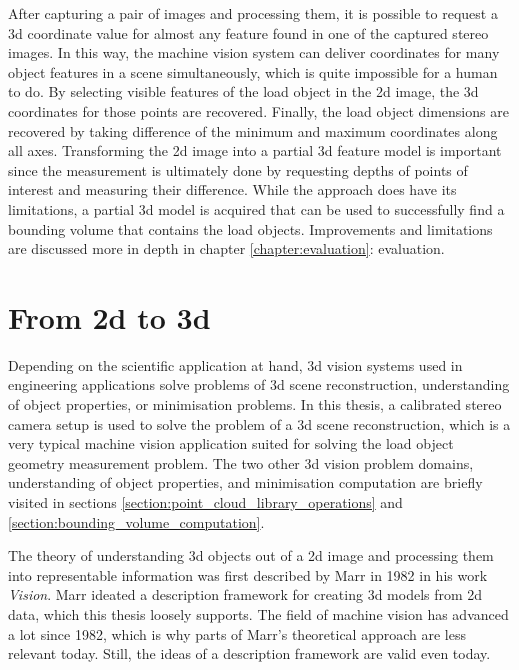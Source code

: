 \documentclass[12pt,a4paper,oneside,pdftex]{report}
\begin{document}
{After capturing a pair of images and processing them, it is possible to request a 3d coordinate value for almost any feature found in one of the captured stereo images. In this way, the machine vision system can deliver coordinates for many object features in a scene simultaneously, which is quite impossible for a human to do. By selecting visible features of the load object in the 2d image, the 3d coordinates for those points are recovered. Finally, the load object dimensions are recovered by taking difference of the minimum and maximum coordinates along all axes. Transforming the 2d image into a partial 3d feature model is important since the measurement is ultimately done by requesting depths of points of interest and measuring their difference. While the approach does have its limitations, a partial 3d model is acquired that can be used to successfully find a bounding volume that contains the load objects. Improvements and limitations are discussed more in depth in chapter \ref{chapter:evaluation}: evaluation.

\section{From 2d to 3d}
\label{section:from_2d_to_3d}

Depending on the scientific application at hand, 3d vision systems used in engineering applications solve problems of 3d scene reconstruction, understanding of object properties, or minimisation problems. In this thesis, a calibrated stereo camera setup is used to solve the problem of a 3d scene reconstruction, which is a very typical machine vision application suited for solving the load object geometry measurement problem. The two other 3d vision problem domains, understanding of object properties, and minimisation computation are briefly visited in sections \ref{section:point_cloud_library_operations} and \ref{section:bounding_volume_computation}. \citep{Sonka07}

The theory of understanding 3d objects out of a 2d image and processing them into representable information was first described by Marr in 1982 in his work \emph{Vision}. Marr ideated a description framework for creating 3d models from 2d data, which this thesis loosely supports. The field of machine vision has advanced a lot since 1982, which is why parts of Marr's theoretical approach are less relevant today. Still, the ideas of a description framework are valid even today.

}
\end{document}
